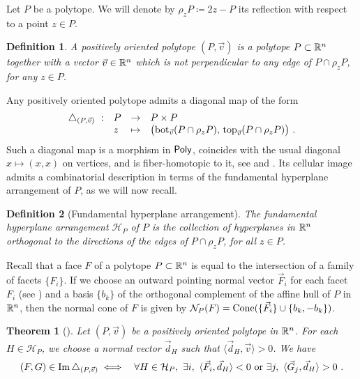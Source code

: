 \documentclass[twoside, 12pt]{amsart}
\newtheorem{definition}{Definition}[section]
\newtheorem{theorem}{Theorem}
\theoremstyle{remark}
\begin{document}
Let $P$ be a polytope.
We will denote by $\rho_z P \coloneqq 2z-P$ its reflection with respect to a point $z \in P$. 

\begin{definition}
A \emph{positively oriented polytope} $(P, \vec v)$ is a polytope $P \subset \mathbb{R}^n$ together with a vector $\vec v\in \mathbb{R}^n$ which is not perpendicular to any edge of $P\cap \rho_z P$, for any $z \in P$.
\end{definition}

Any positively oriented polytope admits a diagonal map of the form
\begin{align*}
\begin{array}{rlcl}
\triangle_{(P,\vec v)}\  : & P &\to  &P \times P\\
&z & \mapsto& 
\bigl(\operatorname{bot}_{\vec v}(P\cap \rho_zP),\,  \operatorname{top}_{\vec v}(P\cap \rho_z P)\bigr) \ .
\end{array}
\end{align*}
Such a diagonal map is a morphism in $\mathsf{Poly}$, coincides with the usual diagonal $x\mapsto (x, x)$ on vertices, and is fiber-homotopic to it, see \cite[Proposition~5]{MTTV19} and \cite[Proposition 1.1]{LA21}.
Its cellular image admits a combinatorial description in terms of the fundamental hyperplane arrangement of $P$, as we will now recall.

\begin{definition}[Fundamental hyperplane arrangement]
  \label{def:fundamentalhyperplane} 
  The \emph{fundamental hyperplane arrangement} $\mathcal{H}_P$ of $P$ is the collection of hyperplanes in $\mathbb{R}^n$ orthogonal to the directions of the edges of $P\cap\rho_z P$, for all $z \in P$. 
\end{definition}

Recall that a face $F$ of a polytope $P \subset \mathbb{R}^n$ is equal to the intersection of a family of facets $\{F_i\}$. 
If we choose an outward pointing normal vector $\vec F_i$ for each facet $F_i$ (see \cite[Definition 1.24]{LA21}) and a basis $\{b_k\}$ of the orthogonal complement of the affine hull of $P$ in $\mathbb{R}^n$, then the normal cone of $F$ is given by $\mathcal{N}_P(F)=\operatorname{Cone}(\{\vec F_i\} \cup \{b_k,-b_k\})$. 

\begin{theorem}[{\cite[Theorem 1.23]{LA21}}]
  \label{thm:universalformula} 
  Let $(P,\vec v)$ be a positively oriented polytope in $\mathbb{R}^n$. For each $H\in\mathcal{H}_P$, we choose a normal vector $\vec d_H$ such that $\langle \vec d_H, \vec v \rangle >0$. We have 
\begin{eqnarray*}
  (F,G) \in \operatorname{Im} \triangle_{(P,\vec v)} 
  &\iff&  \forall H \in \mathcal{H}_P , \ \exists i , \ \langle \vec F_i, \vec d_H \rangle < 0  \text{ or } \exists j , \ \langle \vec G_j, \vec d_H \rangle > 0 \ . 
\end{eqnarray*} 
\end{theorem}
\end{document}
